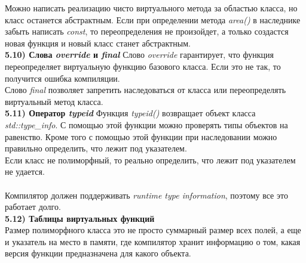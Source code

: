 \documentclass{article}
\begin{document}
Можно написать реализацию чисто виртуального метода за областью класса, но класс останется абстрактным.
Если при определении метода \textit{area()} в наследнике забыть написать \textit{const}, то переопределения не произойдет, а только создастся новая функция и новый класс станет абстрактным.\\
\noindent \textbf{5.10) Слова \textit{override} и \textit{final}}
Слово \textit{override} гарантирует, что функция переопределяет виртуальную функцию базового класса. Если это не так, то получится ошибка компиляции.\\
Слово \textit{final} позволяет запретить наследоваться от класса или переопределять виртуальный метод класса.\\
\noindent \textbf{5.11) Оператор \textit{typeid}}
Функция \textit{typeid()} возвращает объект класса \textit{std::type\_info}. С помощью этой функции можно проверять типы объектов на равенство.
Кроме того с помощью этой функции при наследовании можно правильно определить, что лежит под указателем.\\
Если класс не полиморфный, то реально определить, что лежит под указателем не удается.\\\\
Компилятор должен поддерживать \textit{runtime type information}, поэтому все это работает долго.\\
\noindent \textbf{5.12) Таблицы виртуальных функций}\\
Размер полиморфного класса это не просто суммарный размер всех полей, а еще и указатель на место в памяти, где компилятор хранит информацию о том, какая версия функции предназначена для какого объекта. 
\end{document}
